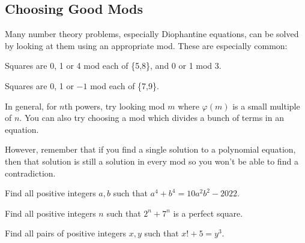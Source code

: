 \subsection{Choosing Good Mods}
Many number theory problems, especially Diophantine equations, can be solved by
looking at them using an appropriate mod. These are especially common:
\begin{result}\label{r:i:n:c:1}
    Squares are 0, 1 or 4 mod each of \{5,8\}, and 0 or 1 mod 3.
\end{result}
\begin{result}\label{r:i:n:c:2}
    Squares are 0, 1 or $-1$ mod each of \{7,9\}.
\end{result}
In general, for $n$th powers, try looking mod $m$ where $\varphi(m)$ is a
small multiple of $n$.
You can also try choosing a mod which divides a bunch of terms in an
equation.

However, remember that if you find a single solution to a polynomial equation, then that
solution is still a solution in every mod so you won't be able to find a
contradiction.
\begin{problem}{\label{p:i:n:c:1}}
  Find all positive integers $a,b$ such that $a^4+b^4=10a^2b^2-2022$.
\end{problem}
\begin{problem}{\label{p:i:n:c:2}}
  Find all positive integers $n$ such that $2^n+7^n$ is a perfect square.
\end{problem}
\begin{problem}{\label{p:i:n:c:3}}
  Find all pairs of positive integers $x,y$ such that $x!+5=y^3$.
\end{problem}
